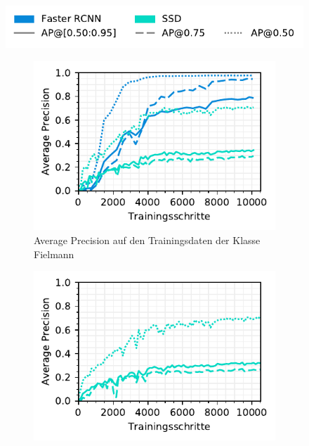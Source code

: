 \begin{figure}[h!] 
  \captionsetup{width=.9\linewidth}
  \caption{TODO}
  \label{fig:specific-ie}
  \centering
  \includegraphics[scale=1]{graphics/matplot/img-detection__legend_3.pdf}
  \begin{subfigure}[b]{0.45\linewidth}
    \centering
    \includegraphics[scale=1]{graphics/matplot/img-detection__fielmann__ap__train.pdf}
    \caption{Average Precision auf den Trainingsdaten der Klasse Fielmann} 
    \label{fig:specific-ie:fielmann:ap_train}
    \vspace{2ex}
  \end{subfigure}%
  \begin{subfigure}[b]{0.45\linewidth}
    \centering
    \includegraphics[scale=1]{graphics/matplot/img-detection__fielmann__ap.pdf}

\end{subfigure}
\end{figure}
